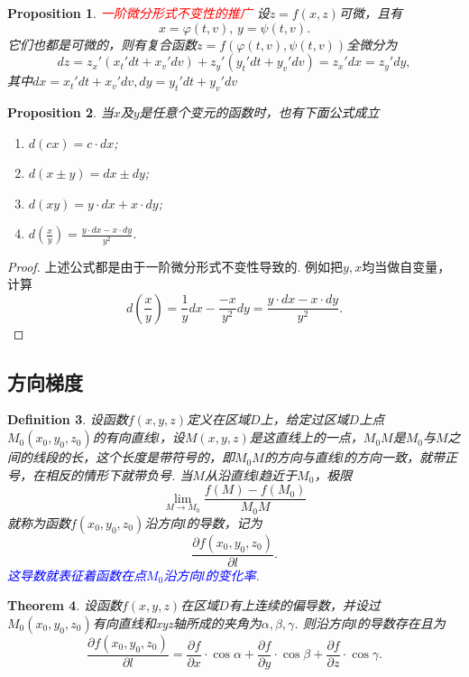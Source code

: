 \documentclass{article}
\newtheorem{theorem}{Theorem}[section]
\newtheorem{proposition}[theorem]{Proposition}
\newtheorem{definition}[theorem]{Definition}
\newcommand{\redt}[1]{\textcolor{red}{#1}}
\newcommand{\bluet}[1]{\textcolor{blue}{#1}}
\begin{document}
\begin{proposition}
\rm \redt{一阶微分形式不变性的推广} 设$z= f(x,z)$可微，且有
$$
x = \varphi(t,v),\, y = \psi(t,v).
$$
它们也都是可微的，则有复合函数$z=f(\varphi(t,v),\psi(t,v))$全微分为
$$
dz= z_x'(x_t'dt + x_v'dv) + z_y'(y_t'dt+y_v'dv) = z_x'dx = z_y'dy, 
$$
其中$dx = x_t'dt + x_v'dv,dy = y_t'dt+y_v'dv$
\end{proposition}

\begin{proposition}
\rm 当$x$及$y$是任意个变元的函数时，也有下面公式成立
\begin{enumerate}
	\item $d(cx)=c\cdot dx$;
	\item $d(x\pm y)=dx \pm dy$;
	\item $d(xy) = y\cdot dx + x\cdot dy$;
	\item $d(\frac{x}{y}) = \frac{y\cdot dx - x\cdot dy}{y^2}$.
\end{enumerate}
\end{proposition}

\begin{proof}
上述公式都是由于一阶微分形式不变性导致的. 例如把$y,x$均当做自变量，计算
$$
d(\frac{x}{y}) = \frac{1}{y}dx - \frac{-x}{y^2}dy = \frac{y\cdot dx - x\cdot dy}{y^2}.
$$
\end{proof}

\subsection{方向梯度}

\begin{definition}
\rm 设函数$f(x,y,z)$定义在区域$D$上，给定过区域$D$上点$M_0(x_0,y_0,z_0)$的有向直线$l$，设$M(x,y,z)$是这直线上的一点，$M_0M$是$M_0$与$M$之间的线段的长，这个长度是带符号的，即$M_0M$的方向与直线$l$的方向一致，就带正号，在相反的情形下就带负号. 当$M$从沿直线$l$趋近于$M_0$，极限
$$
\lim\limits_{M \to M_0} \frac{f(M)-f(M_0)}{M_0M}
$$
就称为函数$f(x_0,y_0,z_0)$沿方向$l$的导数，记为
$$
\frac{\partial f(x_0,y_0,z_0)}{\partial l}.
$$
\bluet{这导数就表征着函数在点$M_0$沿方向$l$的变化率}.
\end{definition}

\begin{theorem}
\rm 设函数$f(x,y,z)$在区域$D$有上连续的偏导数，并设过$M_0(x_0,y_0,z_0)$有向直线和xyz轴所成的夹角为$\alpha,\beta,\gamma$. 则沿方向$l$的导数存在且为
\begin{equation}
\frac{\partial f(x_0,y_0,z_0)}{\partial l} = \frac{\partial f}{\partial x}\cdot\cos \alpha + \frac{\partial f}{\partial y}\cdot\cos \beta + \frac{\partial f}{\partial z}\cdot\cos \gamma. 
\end{equation}
\end{theorem}
\end{document}
